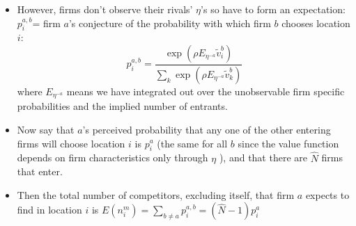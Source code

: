 \begin{frame}%


\begin{itemize}
\item However, firms don't observe their rivals' $\eta $'s so have to form
an expectation:\ $p_{i}^{a,b}$= firm $a$'s conjecture of the probability
with which firm $b$ chooses location $i$:%
\begin{equation*}
p_{i}^{a,b}=\frac{\exp (\rho E_{\eta ^{-a}}\tilde{v}_{i}^{b})}{\sum_{k}\exp
(\rho E_{\eta ^{-a}}\tilde{v}_{k}^{b})}
\end{equation*}%
where $E_{\eta ^{-a}}$ means we have integrated out over the unobservable
firm specific probabilities and the implied number of entrants.

\item Now say that $a$'s perceived probability that any one of the other
entering firms will choose location $i$ is $p_{i}^{a}$ (the same for all $b$
since the value function depends on firm characteristics only through $\eta $%
), and that there are $\hat{N}$ firms that enter.

\item Then the total number of competitors, excluding itself, that firm $a$
expects to find in location $i$ is $E(n_{i}^{m})=\sum_{b\neq a}p_{i}^{a,b}=(%
\hat{N}-1)p_{i}^{a}$
\end{itemize}

\end{frame}%

